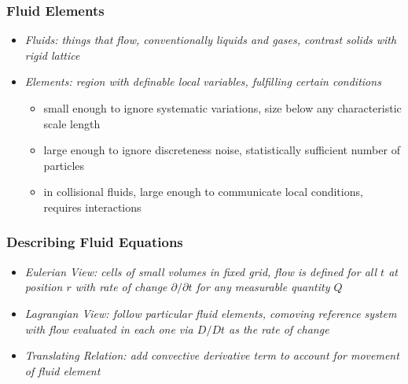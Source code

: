 	\begin{frame}
		\frametitle{Fluid Elements}
		\begin{itemize}
			\item<2-> \itshape{Fluids:} things that flow, conventionally liquids and gases, contrast solids with rigid lattice
			\item<3-> \itshape{Elements:} region with definable local variables, fulfilling certain conditions
			\begin{itemize}
				\item<4-> small enough to ignore systematic variations, size below any characteristic scale length
						  \visible<5->{$$\ell \ll \left|\frac{q}{\nabla q}\right|$$\\[-1ex]}
				\item<6-> large enough to ignore discreteness noise, statistically sufficient number of particles
						  \visible<7->{$$n\ell^3 \gg 1$$\\[-1ex]}
				\item<8-> in collisional fluids, large enough to communicate local conditions, requires interactions
						  \visible<9->{$$\ell \gg \lambda$$\\[-0.5ex]}
			\end{itemize}
		\end{itemize}
	\end{frame}

	\begin{frame}
		\frametitle{Describing Fluid Equations}
		\begin{itemize}
			\item<2-> \itshape{Eulerian View:} cells of small volumes in fixed grid, flow is defined for all $t$ at
					  position $r$ with rate of change $\partial / \partial t$ for any measurable quantity $Q$
			\item<3-> \itshape{Lagrangian View:} follow particular fluid elements, comoving reference system with flow
					  evaluated in each one via $D / D t$ as the rate of change
			\item<4-> \itshape{Translating Relation:} add convective derivative term to account for movement of fluid element
					  \visible<5->{$$\frac{DQ}{Dt} = \frac{\partial Q}{\partial t} + u \cdot \nabla Q$$\\[-4.5ex]}
		\end{itemize}
	\end{frame}


